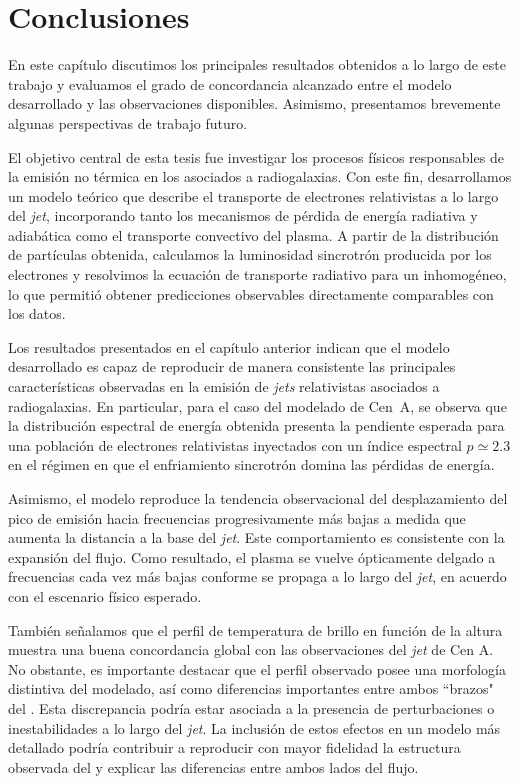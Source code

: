 \chapter{Conclusiones}\label{cha:conclusiones}

	En este capítulo discutimos los principales resultados obtenidos a lo largo de este trabajo y evaluamos el grado de concordancia alcanzado entre el modelo desarrollado y las observaciones disponibles.
	Asimismo, presentamos brevemente algunas perspectivas de trabajo futuro.

	El objetivo central de esta tesis fue investigar los procesos físicos responsables de la emisión no térmica en los \jets asociados a radiogalaxias.
	Con este fin, desarrollamos un modelo teórico que describe el transporte de electrones relativistas a lo largo del \textit{jet}, incorporando tanto los mecanismos de pérdida de energía radiativa y adiabática como el transporte convectivo del plasma.
	A partir de la distribución de partículas obtenida, calculamos la luminosidad sincrotrón producida por los electrones y resolvimos la ecuación de transporte radiativo para un \jet inhomogéneo, lo que permitió obtener predicciones observables directamente comparables con los datos.

	Los resultados presentados en el capítulo anterior indican que el modelo desarrollado es capaz de reproducir de manera consistente las principales características observadas en la emisión de \textit{jets} relativistas asociados a radiogalaxias.
	En particular, para el caso del modelado de Cen~A, se observa que la distribución espectral de energía obtenida presenta la pendiente esperada para una población de electrones relativistas inyectados con un índice espectral $p\simeq2.3$ en el régimen en que el enfriamiento sincrotrón domina las pérdidas de energía.

	Asimismo, el modelo reproduce la tendencia observacional del desplazamiento del pico de emisión hacia frecuencias progresivamente más bajas a medida que aumenta la distancia a la base del \textit{jet}.
	Este comportamiento es consistente con la expansión del flujo.
	Como resultado, el plasma se vuelve ópticamente delgado a frecuencias cada vez más bajas conforme se propaga a lo largo del \textit{jet}, en acuerdo con el escenario físico esperado.

	También señalamos que el perfil de temperatura de brillo en función de la altura muestra una buena concordancia global con las observaciones del \textit{jet} de Cen A.
	No obstante, es importante destacar que el perfil observado posee una morfología distintiva del modelado, así como diferencias importantes entre ambos ``brazos" del \jet.
	Esta discrepancia podría estar asociada a la presencia de perturbaciones o inestabilidades a lo largo del \textit{jet}.
	La inclusión de estos efectos en un modelo más detallado podría contribuir a reproducir con mayor fidelidad la estructura observada del \jet y explicar las diferencias entre ambos lados del flujo.

